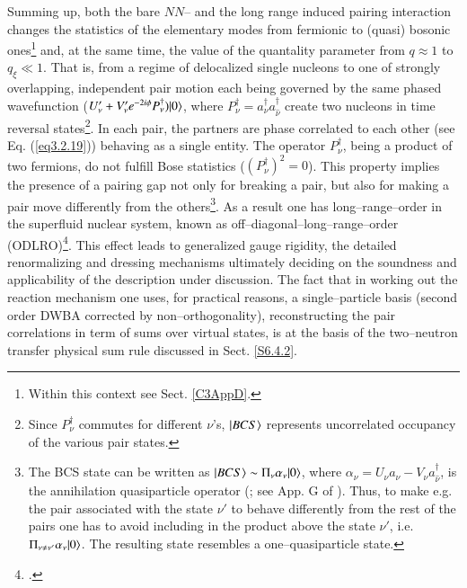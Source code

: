 \begin{subappendices}
Summing up, both the bare $NN$-- and the long range induced pairing interaction changes the statistics of the elementary modes from fermionic to (quasi) bosonic ones\footnote{Within this context see Sect. \ref{C3AppD}.} and, at the same time, the value of the quantality parameter from $q\approx1$ to $q_\xi\ll 1$. That is,   from a regime of delocalized single nucleons to one of strongly overlapping, independent pair motion each being governed by the same phased wavefunction ($U'_{\nu}+V'_{\nu}e^{-2i\phi}P^\dagger_\nu)|{0} \rangle$, where $P^\dagger_\nu=a^\dagger_\nu a^\dagger_{\hat\nu}$ create two nucleons in time reversal states\footnote{Since $P^\dagger_\nu$ commutes for different $\nu$'s, $|{BCS} \rangle$ represents uncorrelated occupancy of the various pair states.}. In each pair, the partners are phase correlated to each other (see Eq. (\ref{eq3.2.19})) behaving as a single entity. The operator $P^\dagger_\nu$, being a product of two fermions, do not fulfill Bose statistics ($(P^\dagger_\nu)^2=0$). This property implies the presence of a pairing gap not only for breaking a pair, but also for making a pair move differently from the others\footnote{The BCS state can be written as $|{BCS} \rangle\sim\Pi_\nu \alpha_\nu|{0} \rangle$, where $\alpha_\nu=U_\nu a_\nu-V_\nu a^\dagger_{\hat{\nu}}$, is the annihilation quasiparticle operator (\cite{Bogoljubov:58,Valatin:58}; see App. G of \cite{Brink:05}). Thus, to make e.g. the pair associated with the state $\nu'$ to behave differently from the rest of the pairs one has to avoid including in the product above the state $\nu'$, i.e. $\Pi_{\nu\neq\nu'} \alpha_\nu|{0} \rangle$. The resulting state resembles a one--quasiparticle state.}. As a result one has long--range--order in the superfluid nuclear system, known as off--diagonal--long--range--order (ODLRO)\footnote{\cite{Yang:62}.}.  This effect leads  to  generalized gauge rigidity, the detailed renormalizing and dressing mechanisms ultimately deciding on the soundness and applicability of the description under discussion. The fact that in working out the reaction mechanism one uses, for practical reasons, a single--particle basis (second order DWBA corrected by non--orthogonality), reconstructing the pair correlations in term of sums over virtual states, is at the basis of the two--neutron transfer physical sum rule discussed in Sect. \ref{S6.4.2}.
 



\end{subappendices}
